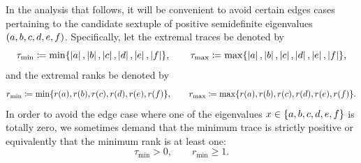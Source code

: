 \documentclass[notitlepage, 10pt]{article}
\begin{document}
\begin{rem}
    In the analysis that follows, it will be convenient to avoid certain edges cases pertaining to the candidate sextuple of positive semidefinite eigenvalues $(a,b,c,d,e,f)$.
    Specifically, let the extremal traces be denoted by
    \begin{equation}
        \tau_{\min} \coloneqq \min\{ \left|a\right|, \left|b\right|, \left|c\right|, \left|d\right|, \left|e\right|, \left|f\right|\},
        \qquad
        \tau_{\max} \coloneqq \max\{ \left|a\right|, \left|b\right|, \left|c\right|, \left|d\right|, \left|e\right|, \left|f\right|\},
    \end{equation}
    and the extremal ranks be denoted by
    \begin{equation}
        r_{\min} \coloneqq \min\{ r(a), r(b), r(c), r(d), r(e), r(f) \},
        \qquad
        r_{\max} \coloneqq \max\{ r(a), r(b), r(c), r(d), r(e), r(f) \}.
    \end{equation}
    In order to avoid the edge case where one of the eigenvalues $x \in \{a,b,c,d,e,f\}$ is totally zero, we sometimes demand that the minimum trace is strictly positive or equivalently that the minimum rank is at least one:
    \begin{equation}
        \tau_{\min} > 0, \qquad r_{\min} \geq 1.
    \end{equation}
\end{rem}
\end{document}
